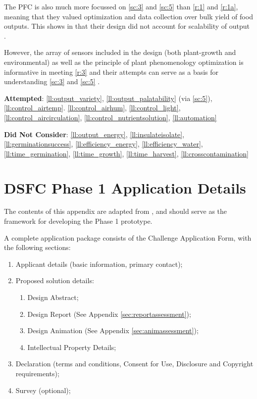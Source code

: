 \documentclass{report}
\begin{document}
\begin{appendices}
The PFC is also much more focussed on \ref{sc:3} and \ref{sc:5} than \ref{r:1} and \ref{r:1a}, meaning that they valued optimization and data collection over bulk yield of food outputs. This shows in that their design did not account for scalability of output \cite{mit-wfp}.

However, the array of sensors included in the design (both plant-growth and environmental) as well as the principle of plant phenomenology optimization is informative in meeting \ref{r:3} and their attempts can serve as a basis for understanding \ref{sc:3} and \ref{sc:5} \cite{mit-openag}.

\textbf{Attempted}: \ref{ll:output_variety}, \ref{ll:output_palatability} (via \ref{sc:5}), \ref{ll:control_airtemp}. \ref{ll:control_airhum}, \ref{ll:control_light}, \ref{ll:control_aircirculation}, \ref{ll:control_nutrientsolution}, \ref{ll:automation}

\textbf{Did Not Consider}: \ref{ll:output_energy}, \ref{ll:insulateisolate}, \ref{ll:germinationsuccess}, \ref{ll:efficiency_energy}, \ref{ll:efficiency_water}, \ref{ll:time_germination}, \ref{ll:time_growth}, \ref{ll:time_harvest}, \ref{ll:crosscontamination}

\newpage
\section{DSFC Phase 1 Application Details}
\label{sec:application}

The contents of this appendix are adapted from \cite{applicantguide}, and should serve as the framework for developing the Phase 1 prototype.

A complete application package consists of the Challenge Application Form, with the following sections:
\begin{enumerate}
    \item Applicant details (basic information, primary contact);
    \item Proposed solution details:
    \begin{enumerate}
        \item Design Abstract;
        \item Design Report (See Appendix \ref{sec:reportassessment});
        \item Design Animation (See Appendix \ref{sec:animassessment});
        \item Intellectual Property Details;
    \end{enumerate}
    \item Declaration (terms and conditions, Consent for Use, Disclosure and Copyright requirements);
    \item Survey (optional);
\end{enumerate}


\end{appendices}
\end{document}
